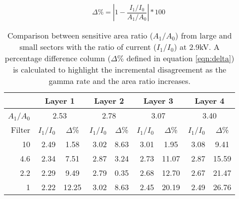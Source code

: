 \begin{equation}\label{eqn:delta}
	\Delta\%=\left|1-\frac{I_1/I_0}{A_1/A_0}\right|*100
\end{equation}


\begin{table}[ht]\footnotesize
	\centering
	\begin{tabular*}{0.7\textwidth}{rrcrcrcrc}
	 & \multicolumn{2}{c}{Layer 1} &\multicolumn{2}{c}{ Layer 2} &\multicolumn{2}{c}{ Layer 3
	}&\multicolumn{2}{c}{Layer 4}\\
	\hline
	$A_1$/$A_0$&\multicolumn{2}{c}{2.53}&\multicolumn{2}{c}{2.78}&\multicolumn{2}{c}{3.07}&\multicolumn{2}{c}{3.40}\\
	Filter & $I_1$/$I_0$ & $\Delta$\%& $I_1$/$I_0$ & $\Delta$\%& $I_1$/$I_0$ &$\Delta$\%& $I_1$/$I_0$ & $\Delta$\%\\ 	
	\hline
	10 	&2.49 &1.58  	&3.02 &8.63		&3.01 &1.95 	&3.08	&9.41 \\
	4.6 &2.34	&7.51 	&2.87 &3.24		&2.73 &11.07 	&2.87	&15.59\\
	2.2	&2.29 &9.49 	&2.79 &0.35		&2.68 &12.70 	&2.67	&21.47\\
	1		&2.22 &12.25 	&3.02 &8.63 	&2.45 &20.19 	&2.49	&26.76\\
	\hline
	\end{tabular*}
	\centering
	\captionsetup{margin=1cm}
	\caption{Comparison between sensitive area ratio ($A_1$/$A_0$) from large and small sectors with the ratio of current
	($I_1$/$I_0$) at 2.9kV. A percentage difference column ($\Delta \%$ defined in equation \ref{eqn:delta}) is calculated to
	highlight the incremental disagreement as the gamma rate and the area ratio increases.}\label{aratio}
\end{table}
